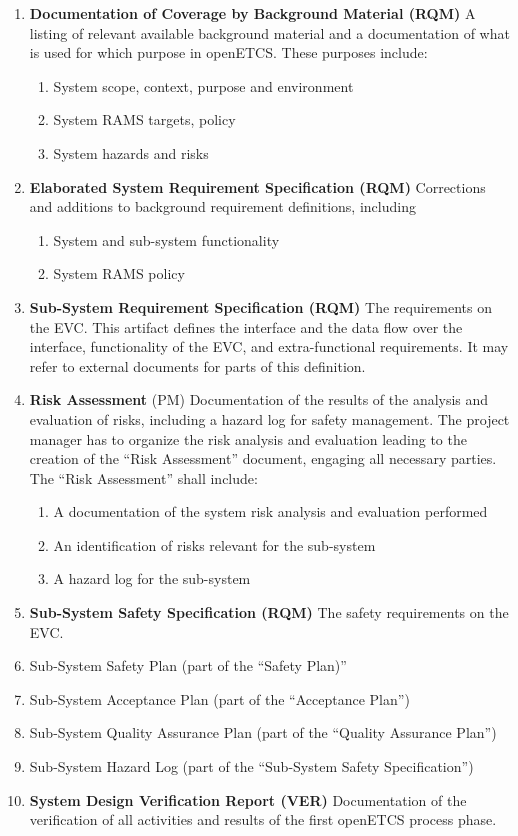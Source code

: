\documentclass{template/openetcs_article}
\begin{document}
\begin{enumerate}
\item \textbf{Documentation of Coverage by Background Material (RQM)}
  A listing of relevant available background material and a
  documentation of what is used for which purpose in openETCS. These
  purposes include:
  \begin{enumerate}
  \item  System scope, context, purpose and environment
  \item System RAMS targets, policy
  \item System hazards and risks
  \end{enumerate}
\item \textbf{Elaborated System Requirement Specification (RQM)}
  Corrections and additions to background requirement definitions,
  including
  \begin{enumerate}
  \item System and sub-system functionality
  \item System RAMS policy
  \end{enumerate}
\item \textbf{Sub-System Requirement Specification (RQM)}  The
  requirements on the EVC. This artifact defines the
  interface and the data flow over the interface, functionality of the
  EVC, and extra-functional requirements. It may refer to external
  documents for parts of this definition.  
\item \textbf{Risk Assessment} (PM)  Documentation of the results of the
  analysis and evaluation of risks, including a hazard log for safety
  management. The project manager has to organize the risk analysis
  and evaluation leading to the creation of the ``Risk Assessment''
  document, engaging all necessary parties. The ``Risk Assessment''
  shall include:
  \begin{enumerate}
  \item A documentation of the system risk analysis and evaluation performed
  \item An identification of risks relevant for the sub-system
  \item A hazard log for the sub-system
  \end{enumerate}
\item \textbf{Sub-System Safety Specification (RQM)} The safety
  requirements on the EVC.
\item Sub-System Safety Plan (part of the ``Safety Plan)''
\item Sub-System Acceptance Plan (part of the ``Acceptance Plan'')
\item Sub-System Quality Assurance Plan (part of the ``Quality Assurance Plan'')
\item Sub-System Hazard Log (part of the ``Sub-System Safety Specification'')
\item \textbf{System Design Verification Report (VER)} Documentation
  of the verification of all activities and results of the first
  openETCS process phase.
\end{enumerate}
\end{document}
